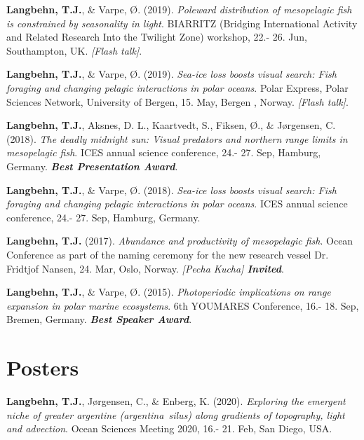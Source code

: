 \documentclass[11pt, a4paper]{awesome-cv}
\begin{document}
\leavevmode\hypertarget{ref-Langbehn10}{}%
\textbf{Langbehn, T.J.}, \& Varpe, Ø. (2019). \emph{Poleward
distribution of mesopelagic fish is constrained by seasonality in
light}. BIARRITZ (Bridging International Activity and Related Research
Into the Twilight Zone) workshop, 22.- 26. Jun, Southampton, UK.
\emph{{[}Flash talk{]}}.

\leavevmode\hypertarget{ref-Langbehn7}{}%
\textbf{Langbehn, T.J.}, \& Varpe, Ø. (2019). \emph{Sea-ice loss boosts
visual search: Fish foraging and changing pelagic interactions in polar
oceans}. Polar Express, Polar Sciences Network, University of Bergen,
15. May, Bergen , Norway. \emph{{[}Flash talk{]}}.

\leavevmode\hypertarget{ref-Langbehn4}{}%
\textbf{Langbehn, T.J.}, Aksnes, D. L., Kaartvedt, S., Fiksen, Ø., \&
Jørgensen, C. (2018). \emph{The deadly midnight sun: Visual predators
and northern range limits in mesopelagic fish}. ICES annual science
conference, 24.- 27. Sep, Hamburg, Germany. \emph{\textbf{Best
Presentation Award}}.

\leavevmode\hypertarget{ref-Langbehn3}{}%
\textbf{Langbehn, T.J.}, \& Varpe, Ø. (2018). \emph{Sea-ice loss boosts
visual search: Fish foraging and changing pelagic interactions in polar
oceans}. ICES annual science conference, 24.- 27. Sep, Hamburg, Germany.

\leavevmode\hypertarget{ref-Langbehn2}{}%
\textbf{Langbehn, T.J.} (2017). \emph{Abundance and productivity of
mesopelagic fish}. Ocean Conference as part of the naming ceremony for
the new research vessel Dr. Fridtjof Nansen, 24. Mar, Oslo, Norway.
\emph{{[}Pecha Kucha{]} \textbf{Invited}}.

\leavevmode\hypertarget{ref-Langbehn1}{}%
\textbf{Langbehn, T.J.}, \& Varpe, Ø. (2015). \emph{Photoperiodic
implications on range expansion in polar marine ecosystems}. 6th
YOUMARES Conference, 16.- 18. Sep, Bremen, Germany. \emph{\textbf{Best
Speaker Award}}.

\endgroup

\hypertarget{posters}{%
\section{Posters}\label{posters}}

\begingroup
\setlength{\parindent}{-0.5in}
\setlength{\leftskip}{0.5in}

\hypertarget{refs_posters}{}
\leavevmode\hypertarget{ref-Langbehn12}{}%
\textbf{Langbehn, T.J.}, Jørgensen, C., \& Enberg, K. (2020).
\emph{Exploring the emergent niche of greater argentine
(argentina~silus) along gradients of topography, light and advection}.
Ocean Sciences Meeting 2020, 16.- 21. Feb, San Diego, USA.
\end{document}
